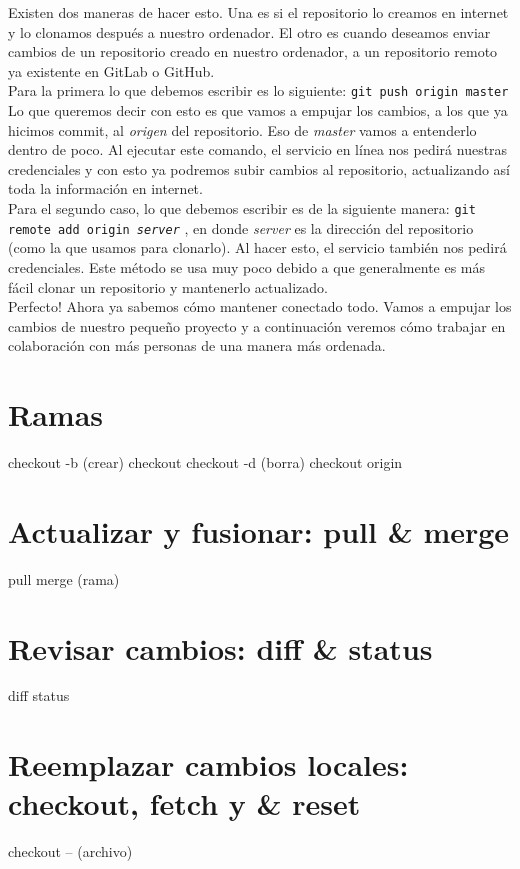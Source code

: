 \documentclass[10pt,letterpaper]{article}
\newcommand{\inlinecode}[1]{
\colorbox{light-gray}{\texttt{#1}}
}
\begin{document}
Existen dos maneras de hacer esto. Una es si el repositorio lo creamos en internet y lo clonamos despu\'es a nuestro ordenador. El otro es cuando deseamos enviar cambios de un repositorio creado en nuestro ordenador, a un repositorio remoto ya existente en GitLab o GitHub.\\

Para la primera lo que debemos escribir es lo siguiente: \inlinecode{git push origin master} Lo que queremos decir con esto es que vamos a empujar los cambios, a los que ya hicimos commit, al \emph{origen} del repositorio. Eso de \emph{master} vamos a entenderlo dentro de poco. Al ejecutar este comando, el servicio en l\'inea nos pedir\'a nuestras credenciales y con esto ya podremos subir cambios al repositorio, actualizando as\'i toda la informaci\'on en internet.\\

Para el segundo caso, lo que debemos escribir es de la siguiente manera: \inlinecode{git remote add origin \emph{server}}, en donde \emph{server} es la direcci\'on del repositorio (como la que usamos para clonarlo). Al hacer esto, el servicio tambi\'en nos pedir\'a credenciales. Este m\'etodo se usa muy poco debido a que generalmente es m\'as f\'acil clonar un repositorio y mantenerlo actualizado.\\

Perfecto! Ahora ya sabemos c\'omo mantener conectado todo. Vamos a empujar los cambios de nuestro peque\~no proyecto y a continuaci\'on veremos c\'omo trabajar en colaboraci\'on con m\'as personas de una manera m\'as ordenada.

\section{Ramas}
checkout -b (crear)
checkout
checkout -d (borra)
checkout origin

\section{Actualizar y fusionar: pull \& merge}
pull
merge (rama)

\section{Revisar cambios: diff \& status}
diff
status

\section{Reemplazar cambios locales: checkout, fetch y \& reset}
checkout -- (archivo)
\end{document}

